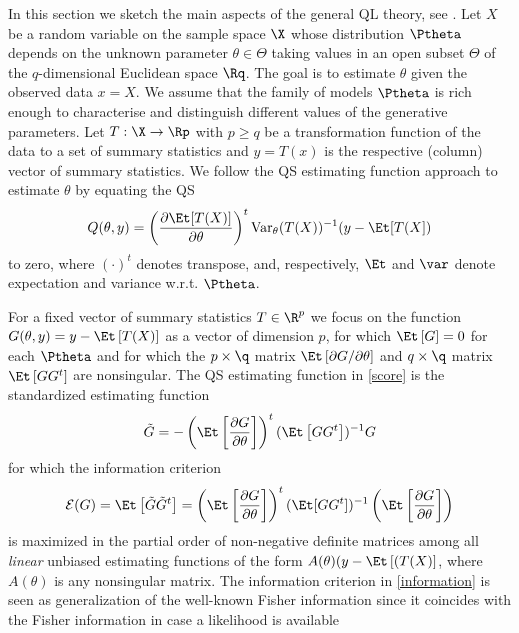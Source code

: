In this section we sketch the main aspects of the general QL theory, see
\cite{ref:Heyde1997}. Let $X$ be a random variable on the sample space $\X$ whose
distribution $\Ptheta$ depends on the unknown parameter $\theta\in\Theta$ taking values
in an open subset $\Theta$ of the $q$-dimensional Euclidean space $\Rq$.
The goal is to estimate $\theta$ given the observed data $x=X$. We
assume that the family of models $\Ptheta$ is rich enough to characterise and distinguish
different values of the generative parameters. Let $T : \X\rightarrow \Rp$ with $p\geq q$ be a
transformation function of the data to a set of summary statistics and $y = T(x)$ is the respective
(column) vector of summary statistics. We follow the QS estimating function
approach to estimate $\theta$ by equating the QS
\begin{equation}\label{score}
  Q(\theta,y)=\left( \frac{\partial\Et[T(X)]}{\partial\theta} \right)^t \mathrm{Var}_{\theta}(T(X))^{-1}(y-\Et[T(X])
\end{equation}
to zero, where $(\cdot)^t$ denotes transpose, and, respectively, $\Et$ and
$\var$ denote expectation and variance w.r.t. $\Ptheta$.\par
%
For a fixed vector of summary statistics $T\in\R^p$ we focus on the function
$G(\theta,y)=y-\Et\left[T(X)\right]$ as a vector of dimension $p$, for which
$\Et\left[G\right]=0$ for each $\Ptheta$ and for which
the $p\times\q$ matrix $\Et\left[\partial G/\partial\theta\right]$
and $q\times\q$ matrix $\Et\left[GG^t\right]$ are nonsingular.
The QS estimating function in \eqref{score} is the standardized estimating
function
\begin{equation}
 \tilde{G} = -\left(\Et\left[\frac{\partial G}{\partial \theta}\right]\right)^t (\Et\left[GG^t\right])^{-1}G
\end{equation}
for which the information criterion
\begin{equation}\label{information}
\mathcal{E}(G) = \Et\left[\tilde{G}\tilde{G}^t\right] = \left( \Et\left[\frac{\partial G}{\partial \theta}\right]\right)^t (\Et[GG^t])^{-1}
\left(\Et\left[\frac{\partial G}{\partial \theta}\right]\right)
\end{equation}
is maximized in the partial order of non-negative definite matrices among all
\emph{linear} unbiased estimating functions
of the form $A(\theta)(y-\Et\left[(T(X)\right]$, where $A(\theta)$ is any
nonsingular matrix. The information criterion in \eqref{information} is seen as generalization of the
well-known Fisher information since it coincides with the Fisher information in case a likelihood is available
